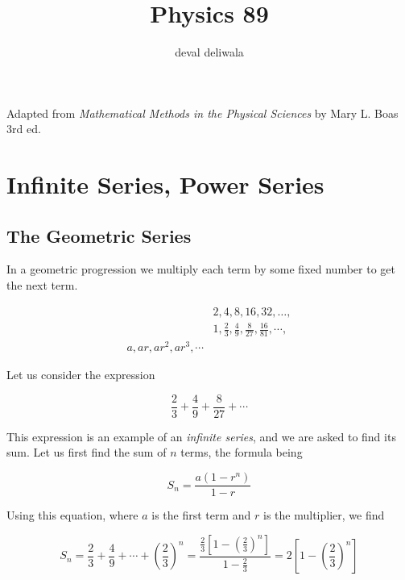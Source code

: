 \documentclass[svgnames]{article}   	%
\title{Physics 89}
\author{deval deliwala}
\begin{document}
\maketitle

Adapted from \textit{Mathematical Methods in the Physical Sciences} by Mary L.
Boas 3rd ed. 

\tableofcontents 	                    %
\newpage

\section{Infinite Series, Power Series}
\vspace{5px}
\subsection{The Geometric Series}
\vspace{5px}

In a geometric progression we multiply each term by some fixed number to get
the next term. 

\begin{align*}
  &2,4,8,16,32,\dots,\\
  &1,\frac{2}{3}, \frac{4}{9}, \frac{8}{27}, \frac{16}{81}, \cdots, \\
  a, ar, ar^2, ar^3, \cdots 
\end{align*}
\vspace{5px}

Let us consider the expression 

\[
\frac{2}{3} + \frac{4}{9} + \frac{8}{27} + \cdots
\]

This expression is an example of an \textit{infinite series}, and we are asked
to find its sum. Let us first find the sum of $n$ terms, the formula being 

\vspace{5px}
\begin{tcolorbox}
\[
S_n = \frac{a(1-r^n)}{1-r}
\]
\end{tcolorbox}
\vspace{5px}
Using this equation, where $a$ is the first term and $r$ is the multiplier, we find

\vspace{5px} \[
S_n = \frac{2}{3} + \frac{4}{9} + \cdots + \left(\frac{2}{3}\right)^n
= \frac{\frac{2}{3}[1-\left(\frac{2}{3}\right)^n]}{1-\frac{2}{3}} = 2 \left[1
  - \left(\frac{2}{3}\right)^n\right]
\] \vspace{5px}
\end{document}
